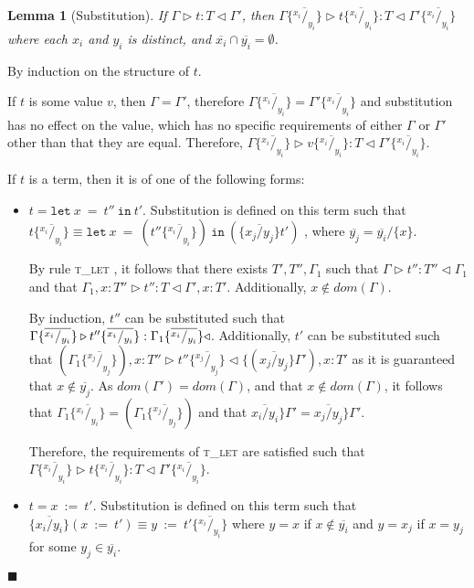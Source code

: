 \documentclass{article}
\newtheorem{lem}{Lemma}
\newcommand{\tlet}{\textsc{t\_let} }
\newcommand{\typerule}[4]{#1 \triangleright #2 : #3 \triangleleft #4}
\newcommand{\subst}[3]{#3 \{\overline{^{#1}/_{#2}}\}}
\newcommand{\lett}[3]{\mathtt{let}\:#1\:\mathtt{=}\:#2\:\mathtt{in}\:#3}
\newcommand{\upt}[2]{#1\:\mathtt{:=}\:#2}
\newcommand{\qed}{$\blacksquare$}
\newenvironment{proof}{\vspace{1ex}\noindent{\bf Proof}\hspace{0.5em}}
  {\hfill\qed\vspace{1ex}}
\begin{document}
\begin{lem}[Substitution]
If $\typerule{\Gamma}{t}{T}{\Gamma'}$, then
$\typerule
{\subst{x_i}{y_i}{\Gamma}}
{\subst{x_i}{y_i}{t}}
{T}
{\subst{x_i}{y_i}{\Gamma'}}$
where each $x_i$ and $y_i$ is distinct, and $\overline{x_i} \cap \overline{y_i} = \emptyset$.
\end{lem}
\begin{proof}
By induction on the structure of $t$.

If $t$ is some value $v$, then $\Gamma = \Gamma'$, therefore
$\subst{x_i}{y_i}{\Gamma} = \subst{x_i}{y_i}{\Gamma'}$
and substitution has no effect on the value, which has no specific requirements
of either $\Gamma$ or $\Gamma'$ other than that they are equal.
Therefore, $\typerule{\subst{x_i}{y_i}{\Gamma}}{\subst{x_i}{y_i}{v}}{T}{\subst{x_i}{y_i}{\Gamma'}}$.

If $t$ is a term, then it is of one of the following forms:

\begin{itemize}
\item $t = \lett{x}{t''}{t'}$. 
Substitution is defined on this term such that
$\subst{x_i}{y_i}{t} \equiv 
\lett{x}{( \subst{x_i}{y_i}{t''} )}{(\{ \overline{x_j / y_j} \}t')}$
, where $\overline{y_j} = \overline{y_i} / \{ x \}$.

By rule \tlet, it follows
that there exists $T', T'', \Gamma_1$ such that
$\typerule{\Gamma}{t''}{T''}{\Gamma_1}$ and that
$\typerule{\Gamma_1, x : T''}{t''}{T}{\Gamma', x : T'}$.
Additionally, $x \notin dom(\Gamma)$.

By induction, $t''$ can be substituted such that 
$\typerule
{\subst{x_i}{y_i}{\Gamma}}
{\subst{x_i}{y_i}{t''}}
{\subst{x_i}{y_i}{\Gamma_1}}
$.
Additionally, $t'$ can be substituted such that
$(\subst{x_j}{y_j}{\Gamma_1}) , x : T'' \triangleright \subst{x_j}{y_j}{t''} \triangleleft \{ (\overline{x_j / y_j} \} \Gamma') , x : T'$ as it is guaranteed that $x \notin \overline{y_j}$.
As $dom(\Gamma') = dom(\Gamma)$, and that $x \notin dom(\Gamma)$, it follows that $\subst{x_i}{y_i}{\Gamma_1} = (\subst{x_j}{y_j}{\Gamma_1})$ and
that $\overline{x_i / y_i} \} \Gamma' = \overline{x_j / y_j} \} \Gamma'$.

Therefore, the requirements of \tlet are satisfied such that
$\typerule{\subst{x_i}{y_i}{\Gamma}}{\subst{x_i}{y_i}{t}}{T}{\subst{x_i}{y_i}{\Gamma'}}$.

\item $t = \upt{x}{t'}$. 
Substitution is defined on this term such that
$\{ \overline{x_i / y_i} \} ( x\::=\:t' ) \equiv y\::=\: \subst{x_i}{y_i}{t'}$
where $y = x$ if $x \notin \overline{y_i}$ and $y = x_j$ if
$x = y_j$ for some $y_j \in \overline{y_i}$.


\end{itemize}
\end{proof}
\end{document}
